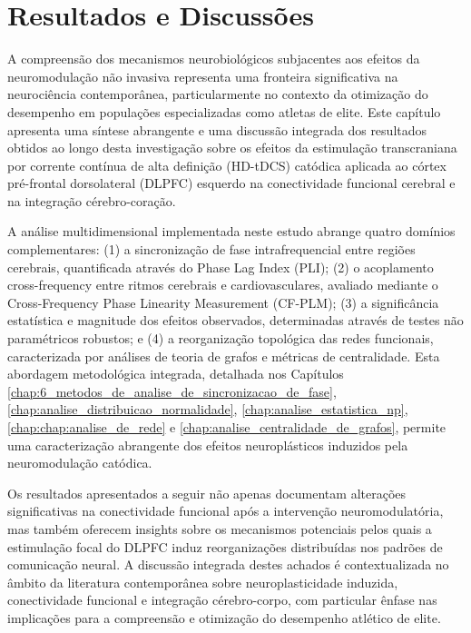 \chapter{Resultados e Discussões}
\label{chap:resultados_e_discussoes}

A compreensão dos mecanismos neurobiológicos subjacentes aos efeitos da neuromodulação não invasiva representa uma fronteira significativa na neurociência contemporânea, particularmente no contexto da otimização do desempenho em populações especializadas como atletas de elite. Este capítulo apresenta uma síntese abrangente e uma discussão integrada dos resultados obtidos ao longo desta investigação sobre os efeitos da estimulação transcraniana por corrente contínua de alta definição (HD-tDCS) catódica aplicada ao córtex pré-frontal dorsolateral (DLPFC) esquerdo na conectividade funcional cerebral e na integração cérebro-coração.

A análise multidimensional implementada neste estudo abrange quatro domínios complementares: (1) a sincronização de fase intrafrequencial entre regiões cerebrais, quantificada através do Phase Lag Index (PLI); (2) o acoplamento cross-frequency entre ritmos cerebrais e cardiovasculares, avaliado mediante o Cross-Frequency Phase Linearity Measurement (CF-PLM); (3) a significância estatística e magnitude dos efeitos observados, determinadas através de testes não paramétricos robustos; e (4) a reorganização topológica das redes funcionais, caracterizada por análises de teoria de grafos e métricas de centralidade. Esta abordagem metodológica integrada, detalhada nos Capítulos \ref{chap:6_metodos_de_analise_de_sincronizacao_de_fase}, \ref{chap:analise_distribuicao_normalidade}, \ref{chap:analise_estatistica_np}, \ref{chap:chap:analise_de_rede} e \ref{chap:analise_centralidade_de_grafos}, permite uma caracterização abrangente dos efeitos neuroplásticos induzidos pela neuromodulação catódica.

Os resultados apresentados a seguir não apenas documentam alterações significativas na conectividade funcional após a intervenção neuromodulatória, mas também oferecem insights sobre os mecanismos potenciais pelos quais a estimulação focal do DLPFC induz reorganizações distribuídas nos padrões de comunicação neural. A discussão integrada destes achados é contextualizada no âmbito da literatura contemporânea sobre neuroplasticidade induzida, conectividade funcional e integração cérebro-corpo, com particular ênfase nas implicações para a compreensão e otimização do desempenho atlético de elite.

